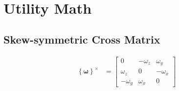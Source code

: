 \documentclass[]{article}
\newcommand{\vb}[1]{\bm{#1}} %
\begin{document}
\section{Utility Math}

\subsection{Skew-symmetric Cross Matrix}

\begin{align}
\label{eq:omega_cross}
\left\{\vb{\omega} \right\}^{\times} &= \left[ \begin{array}{ccc}
0 & -\omega_z & \omega_y \\
\omega_z & 0 & -\omega_x \\
-\omega_y & \omega_x & 0
\end{array} \right]
\end{align}
\end{document}
